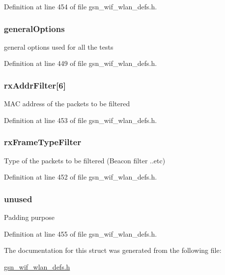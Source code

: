 Definition at line 454 of file gsn\_\-wif\_\-wlan\_\-defs.h.

\hypertarget{a00186_a5e4e9e8d2b76fbb6bdf201c4aeddd60d}{
\subsubsection[{generalOptions}]{ {\bf generalOptions}}}
\label{a00186_a5e4e9e8d2b76fbb6bdf201c4aeddd60d}
general options used for all the tests 

Definition at line 449 of file gsn\_\-wif\_\-wlan\_\-defs.h.

\hypertarget{a00186_ab846177adabc3dd3f04e9f9e7fcc469d}{
\subsubsection[{rxAddrFilter}]{ {\bf rxAddrFilter}\mbox{[}6\mbox{]}}}
\label{a00186_ab846177adabc3dd3f04e9f9e7fcc469d}
MAC address of the packets to be filtered 

Definition at line 453 of file gsn\_\-wif\_\-wlan\_\-defs.h.

\hypertarget{a00186_a59ce6e4a0332eaaa2fdf5fb0fe867452}{
\subsubsection[{rxFrameTypeFilter}]{ {\bf rxFrameTypeFilter}}}
\label{a00186_a59ce6e4a0332eaaa2fdf5fb0fe867452}
Type of the packets to be filtered (Beacon filter ..etc) 

Definition at line 452 of file gsn\_\-wif\_\-wlan\_\-defs.h.

\hypertarget{a00186_a04efd61f68d1dcc6739211e703576ea7}{
\subsubsection[{unused}]{ {\bf unused}}}
\label{a00186_a04efd61f68d1dcc6739211e703576ea7}
Padding purpose 

Definition at line 455 of file gsn\_\-wif\_\-wlan\_\-defs.h.



The documentation for this struct was generated from the following file:\begin{DoxyCompactItemize}
\item 
\hyperlink{a00613}{gsn\_\-wif\_\-wlan\_\-defs.h}\end{DoxyCompactItemize}
